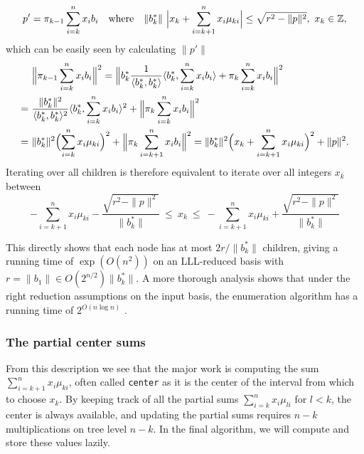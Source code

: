 \documentclass{scrartcl}
\newcommand{\Z}{\mathbb{Z}}
\begin{document}
    \begin{equation*}
        p' = \pi_{k - 1}\sum_{i = k}^n x_i b_i \quad \text{where} \quad \|b_k^*\| \ \Bigl|x_k + \sum_{i = k + 1}^n x_i \mu_{ki} \Bigr| \leq \sqrt{r^2 - \|p\|^2}, \ x_k \in \Z,
    \end{equation*}
    which can be easily seen by calculating $\|p'\|$
    \begin{align*}
        &\Bigl\| \pi_{k - 1}\sum_{i = k}^n x_i b_i \Bigr\|^2 = \Bigl\| b^*_k \frac 1 {\langle b^*_k, b^*_k \rangle} \langle b^*_k, \sum_{i = k}^n x_i b_i \rangle + \pi_k \sum_{i = k}^n x_i b_i \Bigr\|^2 \\
        =\ &\frac {\| b_k^* \|^2} {\langle b^*_k, b^*_k \rangle^2} \langle b_k^*, \sum_{i = k}^n x_i b_i \rangle^2 + \Bigl\| \pi_k \sum_{i = k}^n x_i b_i \Bigr\|^2 \\
        =\ &\| b^*_k \| ^2 \Bigl( \sum_{i = k}^n x_i\mu_{ki} \Bigr)^2 + \Bigl\| \pi_k \sum_{i = k + 1}^n x_i b_i \Bigr\|^2 = \|b_k^*\|^2 \Bigl( x_k + \sum_{i = k + 1}^n x_i \mu_{ki} \Bigr)^2 + \| p \|^2 .
    \end{align*}
    Iterating over all children is therefore equivalent to iterate over all integers $x_k$ between
    \begin{equation*}
        -\sum_{i = k + 1}^n x_i \mu_{ki} - \frac {\sqrt{r^2 - \|p\|^2}} {\| b_k^* \|} \ \leq \  x_k \ \leq \ -\sum_{i = k + 1}^n x_i \mu_{ki} + \frac {\sqrt{r^2 - \|p\|^2}} {\| b_k^* \|}
    \end{equation*}

    This directly shows that each node has at most $2r/\| b_k^* \|$ children, giving a running time of $\exp({O(n^2)})$ on an LLL-reduced basis with $r = \| b_1 \| \in O(2^{n/2}) \| b_k^* \|$. 
    A more thorough analysis shows that under the right reduction assumptions on the input basis, the enumeration algorithm has a running time of $2^{O(n\log n)}$ \cite{enum1, enum_complexity}.

    \subsubsection*{The partial center sums}

    \label{sec:center_partsums}
    From this description we see that the major work is computing the sum $\sum_{i = k + 1}^n x_i \mu_{ki}$, often called \texttt{center} as it is the center of the interval from which to choose $x_k$. By keeping track of all the partial sums $\sum_{i=k}^n x_i \mu_{li}$ for $l < k$, the center is always available, and updating the partial sums requires $n - k$ multiplications on tree level $n - k$.
    In the final algorithm, we will compute and store these values lazily.
\end{document}
